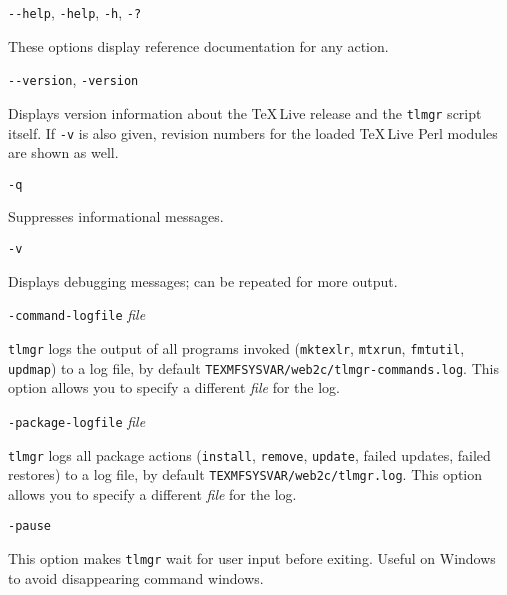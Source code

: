 \documentclass[11pt]{article}
\begin{document}
\begin{description}

\item\texttt{-\relax-help}, \texttt{-help}, \texttt{-h}, \texttt{-?}\par

These options display reference documentation for any
action.

\item\texttt{-\relax-version}, \texttt{-version}\par

Displays version information about the \TeX\,Live release
and the \texttt{tlmgr} script itself. If \texttt{-v} is
also given, revision numbers for the loaded \TeX\,Live Perl
modules are shown as well.

\item\texttt{-q}\par  

Suppresses informational messages.

\item\texttt{-v}\par 

Displays debugging messages; can be repeated for more
output.

\item\texttt{-command-logfile} \textsl{file}\par

\texttt{tlmgr} logs the output of all programs invoked
(\verb|mktexlr|, \verb|mtxrun|, \verb|fmtutil|,
\verb|updmap|) to a log file, by default
\texttt{TEXMFSYSVAR/web2c/tlmgr-commands.log}. This option
allows you to specify a different \textsl{file} for the log.

\item\texttt{-package-logfile} \textsl{file}\par

\texttt{tlmgr} logs all package actions (\verb|install|,
\verb|remove|, \verb|update|, failed updates,
failed restores) to a log file, by default
\texttt{TEXMFSYSVAR/web2c/tlmgr.log}. This option allows you
to specify a different \textsl{file} for the log.

\item\texttt{-pause}\par 

This option makes \texttt{tlmgr} wait for user input before
exiting. Useful on Windows to avoid disappearing command
windows.


\end{description}
\end{document}
